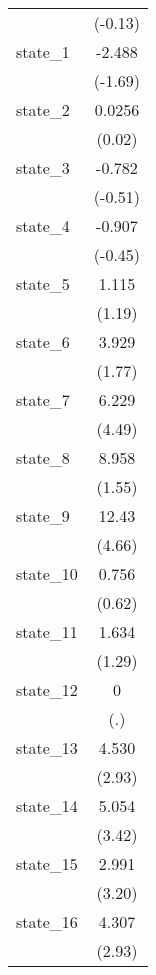 {\begin{tabular}{l*{1}{c}}
            &     (-0.13)         \\
[1em]
state\_1     &      -2.488         \\
            &     (-1.69)         \\
[1em]
state\_2     &      0.0256         \\
            &      (0.02)         \\
[1em]
state\_3     &      -0.782         \\
            &     (-0.51)         \\
[1em]
state\_4     &      -0.907         \\
            &     (-0.45)         \\
[1em]
state\_5     &       1.115         \\
            &      (1.19)         \\
[1em]
state\_6     &       3.929         \\
            &      (1.77)         \\
[1em]
state\_7     &       6.229\sym{***}\\
            &      (4.49)         \\
[1em]
state\_8     &       8.958         \\
            &      (1.55)         \\
[1em]
state\_9     &       12.43\sym{***}\\
            &      (4.66)         \\
[1em]
state\_10    &       0.756         \\
            &      (0.62)         \\
[1em]
state\_11    &       1.634         \\
            &      (1.29)         \\
[1em]
state\_12    &           0         \\
            &         (.)         \\
[1em]
state\_13    &       4.530\sym{**} \\
            &      (2.93)         \\
[1em]
state\_14    &       5.054\sym{***}\\
            &      (3.42)         \\
[1em]
state\_15    &       2.991\sym{**} \\
            &      (3.20)         \\
[1em]
state\_16    &       4.307\sym{**} \\
            &      (2.93)         \\

\end{tabular}}
